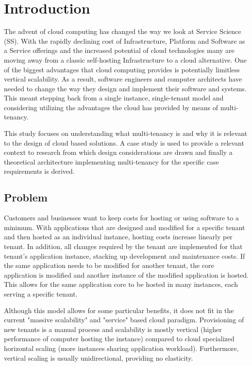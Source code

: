 \chapter{Introduction}
The advent of cloud computing  has changed the way we look at Service Science (SS). With the rapidly declining cost of Infrastructure, Platform and Software as a Service offerings and the increased potential of cloud technologies many are moving away from a classic self-hosting Infrastructure to a cloud alternative. One of the biggest advantages that cloud computing provides is potentially limitless vertical scalability. As a result, software engineers and computer architects have needed to change the way they design and implement their software and systems. This meant stepping back from a single instance, single-tenant model and considering utilizing the advantages the cloud has provided by means of multi-tenancy.
 
This study focuses on understanding what multi-tenancy is and why it is relevant to the design of cloud based solutions. A case study is used to provide a relevant context to research from which design considerations are drawn and finally a theoretical architecture implementing multi-tenancy for the specific case requirements is derived.


\section{Problem}
 
Customers and businesses want to keep costs for hosting or using software to a minimum. With applications that are designed and modified for a specific tenant and then hosted as an individual instance, hosting costs increase linearly per tenant. In addition, all changes required by the tenant are implemented for that tenant's application instance, stacking up development and maintenance costs. If the same application needs to be modified for another tenant, the core application is modified and another instance of the modified application is hosted. This allows for the same application core to be hosted in many instances, each serving a specific tenant. 

Although this model allows for some particular benefits, it does not fit in the current "massive scalability" and "service" based cloud paradigm. Provisioning of new tenants is a manual process and scalability is mostly vertical (higher performance of computer hosting the instance) compared to cloud specialized horizontal scaling (more instances sharing application workload). Furthermore, vertical scaling is usually unidirectional, providing no elasticity. 

